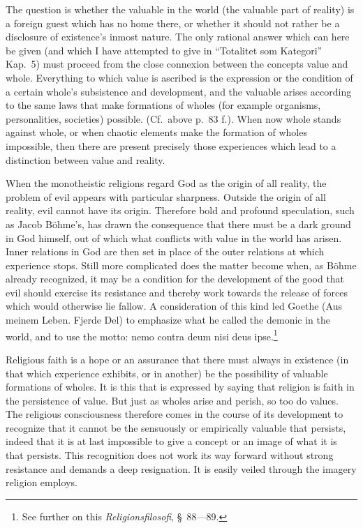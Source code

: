 \documentclass[12pt]{article}
\newcommand{\opage}[1]{\marginnote{\footnotesize\textit{[#1]}}}
\begin{document}
The question is whether the valuable in the world (the valuable part of
reality) is a foreign guest which has no home there, or whether it should
not rather be a disclosure of existence's inmost nature. The only rational
answer which can here be given (and which I have attempted to give in
``Totalitet som Kategori'' Kap.~5) must proceed from the close connexion
between the concepts value and whole. Everything to which value is ascribed
is the expression or the condition of a certain whole's subsistence and
development, and the valuable arises according to the same laws that make
formations of wholes (for example organisms, personalities, societies)
possible. (Cf.\ above p.~83 f.). When now whole stands against whole, or
when chaotic elements make the formation of wholes impossible, then there
are present precisely those experiences which lead to a distinction between
value and reality.

When the monotheistic religions regard God as the origin of all reality, the
problem of evil appears with particular sharpness. Outside the origin of all
reality, evil cannot have its origin. Therefore bold and profound
speculation, such as Jacob Böhme's, has drawn the consequence that there
must be a dark ground in God himself, out of which what conflicts with value
in the world has arisen. Inner relations in God are then set in place of the
outer relations at which experience stops. Still more complicated does the
matter become when, as Böhme already recognized, it may be a condition for
the development of the good that evil should exercise its resistance and
thereby work towards the release of forces which would otherwise lie fallow.
A consideration of this kind \opage{97}led Goethe (Aus meinem Leben. Fjerde Del) to
emphasize what he called the demonic in the world, and to use the motto:
nemo contra deum nisi deus ipse.\footnote{See further on this
\textit{Religionsfilosofi}, §~88---89.}

Religious faith is a hope or an assurance that there must always in
existence (in that which experience exhibits, or in another) be the
possibility of valuable formations of wholes. It is this that is expressed
by saying that religion is faith in the persistence of value. But just as
wholes arise and perish, so too do values. The religious consciousness
therefore comes in the course of its development to recognize that it cannot
be the sensuously or empirically valuable that persists, indeed that it is
at last impossible to give a concept or an image of what it is that
persists. This recognition does not work its way forward without strong
resistance and demands a deep resignation. It is easily veiled through the
imagery religion employs.
\end{document}
